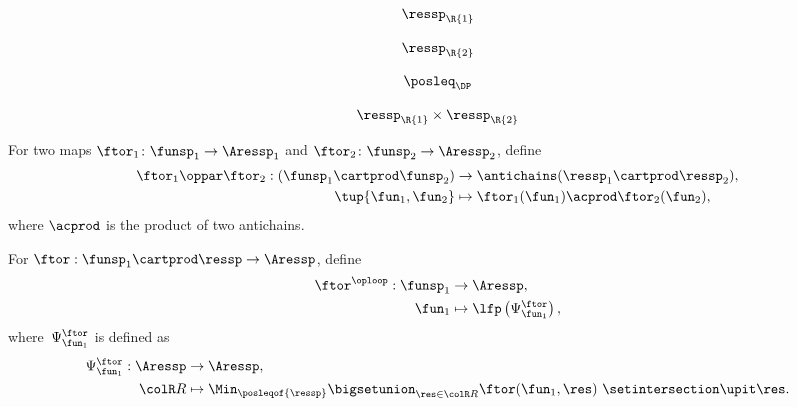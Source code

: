 \begin{forslides}



    \begin{equation}
        \label{eq:ressp1}
        \ressp_\R{1}
    \end{equation}

    \begin{equation}
        \label{eq:ressp2}
        \ressp_\R{2}
    \end{equation}

    \begin{equation}
        \label{eq:posleqDP}
        \posleq_\DP
    \end{equation}

    \begin{equation}
        \label{eq:ressp12}
        \ressp_\R{1}\times \ressp_\R{2}
    \end{equation}
\end{forslides}

\begin{definition}
     \label{def:oppar}
    For two maps $\ftor_{1}\colon\funsp_{1}\rightarrow\Aressp_{1}$ and $\ftor_{2}\colon\funsp_{2}\rightarrow\Aressp_{2}$, define
    \begin{align}
        \ftor_{1}\oppar\ftor_{2}:(\funsp_{1}\cartprod\funsp_{2}) & \rightarrow\antichains(\ressp_{1}\cartprod\ressp_{2}),\label{eq:oppar} \\
        \tup{ \fun_{1},\fun_{2}}                                 & \mapsto\ftor_{1}(\fun_{1})\acprod\ftor_{2}(\fun_{2}),\nonumber
    \end{align}
    where $\acprod$ is the product of two antichains.
\end{definition}

\begin{definition}
    \label{def:oploop1}
    For $\ftor:\funsp_{1}\cartprod\ressp\rightarrow\Aressp$,
    define
    \begin{align}
        \ftor^{\oploop}:\funsp_{1} & \rightarrow\Aressp,\nonumber \\
        \fun_{1}                   & \mapsto\lfp\left(\Psi_{\fun_{1}}^{\ftor}\right),
    \end{align}
    where~$\Psi_{\fun_{1}}^{\ftor}$ is defined as
    \begin{align}
        \Psi_{\fun_{1}}^{\ftor}:\Aressp & \rightarrow\Aressp,\nonumber \\
        {\colR R}                       & \mapsto\Min_{\posleqof{\ressp}}\bigsetunion_{\res\in{\colR R}}\ftor(\fun_{1},\res)\ \setintersection\upit\res.
        \label{eq:phi}
    \end{align}
\end{definition}

